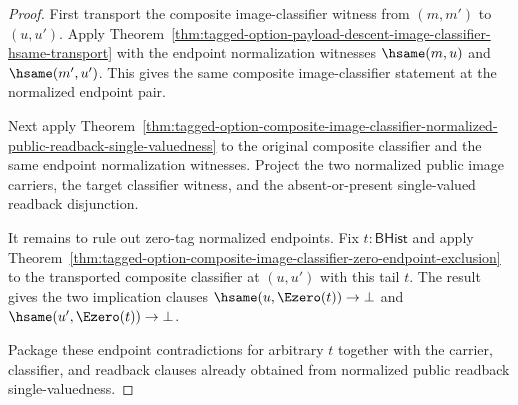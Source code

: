 \begin{proof}
First transport the composite image-classifier witness from $(m,m')$ to
$(u,u')$. Apply
Theorem~\ref{thm:tagged-option-payload-descent-image-classifier-hsame-transport}
with the endpoint normalization witnesses $\hsame(m,u)$ and $\hsame(m',u')$.
This gives the same composite image-classifier statement at the normalized
endpoint pair.

Next apply
Theorem~\ref{thm:tagged-option-composite-image-classifier-normalized-public-readback-single-valuedness}
to the original composite classifier and the same endpoint normalization
witnesses. Project the two normalized public image carriers, the target
classifier witness, and the absent-or-present single-valued readback
disjunction.

It remains to rule out zero-tag normalized endpoints. Fix
$t:\mathsf{BHist}$ and apply
Theorem~\ref{thm:tagged-option-composite-image-classifier-zero-endpoint-exclusion}
to the transported composite classifier at $(u,u')$ with this tail $t$. The
result gives the two implication clauses
$\hsame(u,\Ezero(t))\to\bot$ and
$\hsame(u',\Ezero(t))\to\bot$.

Package these endpoint contradictions for arbitrary $t$ together with the
carrier, classifier, and readback clauses already obtained from normalized
public readback single-valuedness.
\end{proof}

